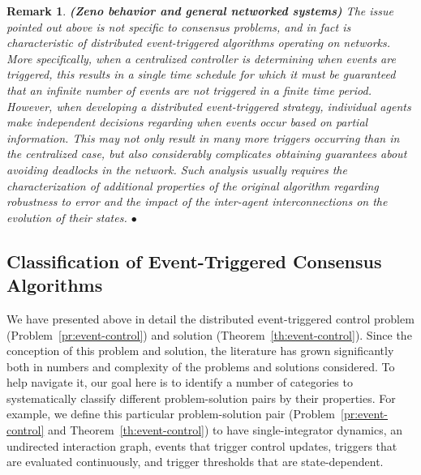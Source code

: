 \documentclass{autart}
\newtheorem{remark}[theorem]{Remark}
\newcommand{\oprocendsymbol}{\hbox{$\bullet$}}
\newcommand{\oprocend}{\relax\ifmmode\else\unskip\hfill\fi\oprocendsymbol}
\newcommand{\longthmtitle}[1]{\mbox{}\textup{\textbf{(#1)}}}
\begin{document}
\begin{remark}\longthmtitle{Zeno behavior and general
    {networked} systems} 
  {\rm The issue pointed out above is not specific to consensus
    problems, and in fact is characteristic of distributed
    event-triggered algorithms operating on networks.  More
    specifically, when a centralized controller is determining when
    events are triggered, this results in a single time schedule for
    which it must be guaranteed that an infinite number of events are
    not triggered in a finite time period. However, when developing a
    distributed event-triggered strategy, individual agents make
    independent decisions regarding when events occur based on partial
    information. This may not only result in many more triggers
    occurring than in the centralized case, but also considerably
    complicates obtaining guarantees about avoiding deadlocks in the
    network. Such analysis usually requires the characterization of
    additional properties of the original algorithm regarding
    robustness to error and the impact of the inter-agent
    interconnections on the evolution of their states.}  \oprocend
\end{remark}

\subsection{Classification of Event-Triggered Consensus
  Algorithms}\label{se:classification}

We have presented above in detail the distributed event-triggered
control problem (Problem~\ref{pr:event-control}) and solution
(Theorem~\ref{th:event-control}).  Since the conception of this
problem and solution, the literature has grown significantly both in
numbers and complexity of the problems and solutions considered. To
help navigate it, our goal here is to identify a number of categories
to systematically classify different problem-solution pairs by their
properties.  For example, we define this particular problem-solution
pair (Problem~\ref{pr:event-control} and
Theorem~\ref{th:event-control}) to have single-integrator dynamics, an
undirected interaction graph, events that trigger control updates,
triggers that are evaluated continuously, and trigger thresholds that
are state-dependent.
\end{document}
